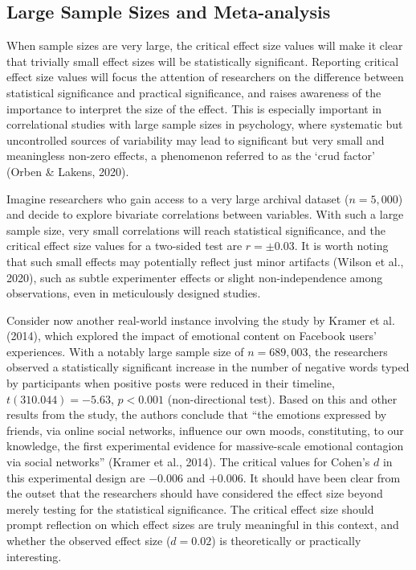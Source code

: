\documentclass[
  man,floatsintext]{apa7}
\begin{document}
\subsection{Large Sample Sizes and Meta-analysis}\label{large-sample-sizes-and-meta-analysis}

When sample sizes are very large, the critical effect size values will make it clear that trivially small effect sizes will be statistically significant. Reporting critical effect size values will focus the attention of researchers on the difference between statistical significance and practical significance, and raises awareness of the importance to interpret the size of the effect. This is especially important in correlational studies with large sample sizes in psychology, where systematic but uncontrolled sources of variability may lead to significant but very small and meaningless non-zero effects, a phenomenon referred to as the `crud factor' (Orben \& Lakens, 2020).

Imagine researchers who gain access to a very large archival dataset (\(n = 5,000\)) and decide to explore bivariate correlations between variables. With such a large sample size, very small correlations will reach statistical significance, and the critical effect size values for a two-sided test are \(r = \pm 0.03\). It is worth noting that such small effects may potentially reflect just minor artifacts (Wilson et al., 2020), such as subtle experimenter effects or slight non-independence among observations, even in meticulously designed studies.

Consider now another real-world instance involving the study by Kramer et al. (2014), which explored the impact of emotional content on Facebook users' experiences. With a notably large sample size of \(n = 689,003\), the researchers observed a statistically significant increase in the number of negative words typed by participants when positive posts were reduced in their timeline, \(t(310.044) = −5.63\), \(p < 0.001\) (non-directional test). Based on this and other results from the study, the authors conclude that ``the emotions expressed by friends, via online social networks, influence our own moods, constituting, to our knowledge, the first experimental evidence for massive-scale emotional contagion via social networks'' (Kramer et al., 2014). The critical values for Cohen's \(d\) in this experimental design are \(-0.006\) and \(+0.006\). It should have been clear from the outset that the researchers should have considered the effect size beyond merely testing for the statistical significance. The critical effect size should prompt reflection on which effect sizes are truly meaningful in this context, and whether the observed effect size (\(d = 0.02\)) is theoretically or practically interesting.
\end{document}
